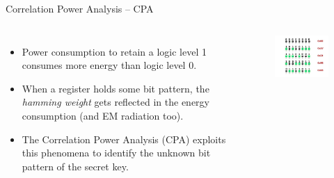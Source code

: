 \documentclass[handout]{beamer}
\begin{document}
\begin{frame}{Correlation Power Analysis -- CPA}

\begin{columns}


\begin{itemize}
\footnotesize

\item Power consumption to retain a logic level 1 consumes more energy than logic level 0.

\vspace{10pt}

\item When a register holds some bit pattern, the \emph{hamming weight} gets reflected in the energy consumption (and EM radiation too).

\vspace{10pt}

\item The Correlation Power Analysis (CPA) exploits this phenomena to identify the unknown bit pattern of the secret key.

\end{itemize}


\begin{figure}
\includegraphics[width=150pt]{figures/hamming-weight-illustration.png}
\end{figure}

\end{columns}

\end{frame}
\end{document}
